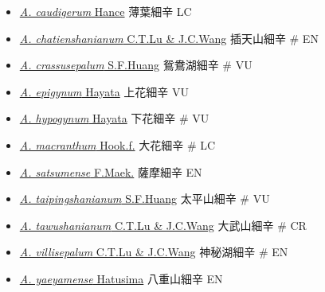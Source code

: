 \begin{itemize}
  \begin{itemize}
        \item[] \href{http://www.theplantlist.org/tpl1.1/search?q=Asarum+caudigerum}{\textit{A. caudigerum} Hance}   薄葉細辛   LC
        \item[] \href{http://www.theplantlist.org/tpl1.1/search?q=Asarum+chatienshanianum}{\textit{A. chatienshanianum} C.T.Lu \& J.C.Wang}   插天山細辛  \# EN
        \item[] \href{http://www.theplantlist.org/tpl1.1/search?q=Asarum+crassusepalum}{\textit{A. crassusepalum} S.F.Huang}   鴛鴦湖細辛  \# VU
        \item[] \href{http://www.theplantlist.org/tpl1.1/search?q=Asarum+epigynum}{\textit{A. epigynum} Hayata}   上花細辛   VU
        \item[] \href{http://www.theplantlist.org/tpl1.1/search?q=Asarum+hypogynum}{\textit{A. hypogynum} Hayata}   下花細辛  \# VU
        \item[] \href{http://www.theplantlist.org/tpl1.1/search?q=Asarum+macranthum}{\textit{A. macranthum} Hook.f.}   大花細辛  \# LC
        \item[] \href{http://www.theplantlist.org/tpl1.1/search?q=Asarum+satsumense}{\textit{A. satsumense} F.Maek.}   薩摩細辛   EN
        \item[] \href{http://www.theplantlist.org/tpl1.1/search?q=Asarum+taipingshanianum}{\textit{A. taipingshanianum} S.F.Huang}   太平山細辛  \# VU
        \item[] \href{http://www.theplantlist.org/tpl1.1/search?q=Asarum+tawushanianum}{\textit{A. tawushanianum} C.T.Lu \& J.C.Wang}   大武山細辛  \# CR
        \item[] \href{http://www.theplantlist.org/tpl1.1/search?q=Asarum+villisepalum}{\textit{A. villisepalum} C.T.Lu \& J.C.Wang}   神秘湖細辛  \# EN
        \item[] \href{http://www.theplantlist.org/tpl1.1/search?q=Asarum+yaeyamense}{\textit{A. yaeyamense} Hatusima}   八重山細辛   EN
  \end{itemize}
  \end{itemize}
